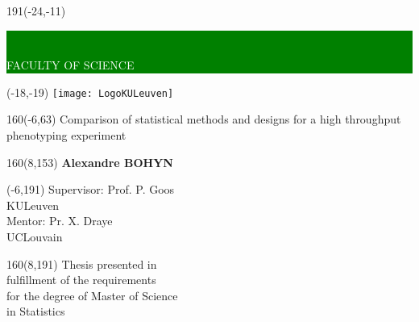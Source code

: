 %

\thispagestyle{empty}
\newcommand{\form}[1]{\scalebox{1.087}{\boldmath{#1}}}

%
\begin{textblock}{191}(-24,-11)
\colorbox{green}{\hspace{139mm}\ \parbox[c][18truemm]{52mm}{\textcolor{white}{FACULTY OF SCIENCE}}}
\end{textblock}
%
\begin{textblock}{70}(-18,-19)
\textblockcolour{}
\texttt{[image: LogoKULeuven]}
\end{textblock}
%
\begin{textblock}{160}(-6,63)
\textblockcolour{}
\vspace{-\parskip}
\flushleft
\fontsize{40}{42}\selectfont \textcolor{bluetitle}{Comparison of statistical methods and designs for a high throughput phenotyping experiment}\\[1.5mm]
\end{textblock}
%
\begin{textblock}{160}(8,153)
\textblockcolour{}
\vspace{-\parskip}
\flushright
\fontsize{14}{16}\selectfont \textbf{Alexandre BOHYN}
\end{textblock}
%
\begin{textblock}{70}(-6,191)
\textblockcolour{}
\vspace{-\parskip}
\flushleft
Supervisor: Prof. P. Goos\\[-2pt]
\textcolor{blueaff}{KULeuven}\\[5pt]
Mentor: Pr. X. Draye\\[-2pt]
\textcolor{blueaff}{UCLouvain}\\[5pt]
\end{textblock}
%
\begin{textblock}{160}(8,191)
\textblockcolour{}
\vspace{-\parskip}
\flushright
Thesis presented in\\[4.5pt]
fulfillment of the requirements\\[4.5pt]
for the degree of Master of Science\\[4.5pt]
in Statistics\\
\end{textblock}
